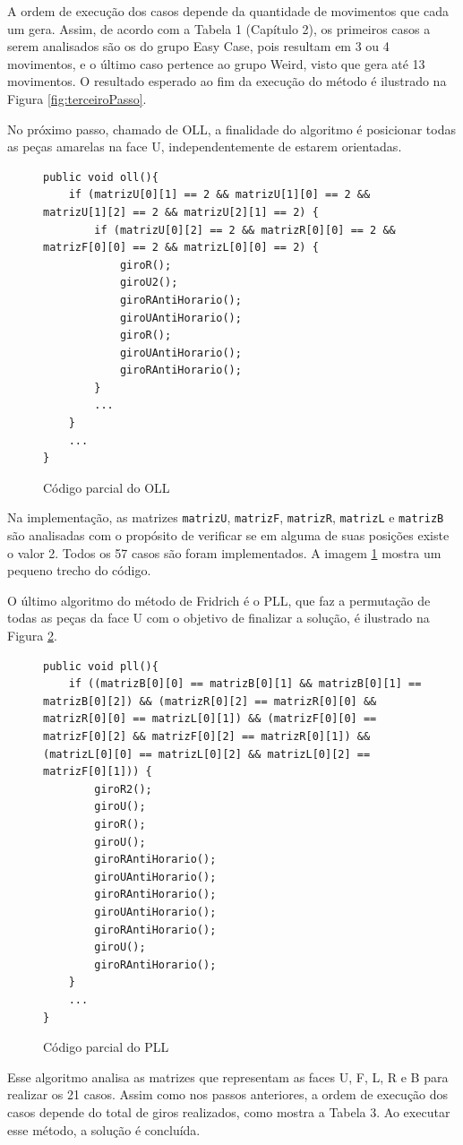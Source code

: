 A ordem de execução dos casos depende da quantidade de movimentos que cada um gera. Assim, de acordo com a Tabela 1 (Capítulo 2), os primeiros casos a serem analisados são os do grupo Easy Case, pois resultam em 3 ou 4 movimentos, e o último caso pertence ao grupo Weird, visto que gera até 13 movimentos. O resultado esperado ao fim da execução do método é ilustrado na Figura \ref{fig:terceiroPasso}.


No próximo passo, chamado de OLL, a finalidade do algoritmo é posicionar todas as peças amarelas na face U, independentemente de estarem orientadas. 

\begin{figure}[!htb]
\begin{lstlisting}
public void oll(){
    if (matrizU[0][1] == 2 && matrizU[1][0] == 2 && matrizU[1][2] == 2 && matrizU[2][1] == 2) {
        if (matrizU[0][2] == 2 && matrizR[0][0] == 2 && matrizF[0][0] == 2 && matrizL[0][0] == 2) {
            giroR();
            giroU2();
            giroRAntiHorario();
            giroUAntiHorario();
            giroR();
            giroUAntiHorario();
            giroRAntiHorario();
        }
        ...
    }
    ...
}
\end{lstlisting}
\caption{Código parcial do OLL}
\label{fig:fridrich3}
\end{figure}

Na implementação, as matrizes {\tt matrizU}, {\tt matrizF}, {\tt matrizR}, {\tt matrizL} e {\tt matrizB} são analisadas com o propósito de verificar se em alguma de suas posições existe o valor 2. Todos os 57 casos são foram implementados. A imagem \ref{fig:fridrich3} mostra um pequeno trecho do código. 



O último algoritmo do método de Fridrich é o PLL, que faz a permutação de todas as peças da face U com o objetivo de finalizar a solução, é ilustrado na Figura \ref{fig:fridrich4}.




\begin{figure}[!htb]
\begin{lstlisting}
public void pll(){
    if ((matrizB[0][0] == matrizB[0][1] && matrizB[0][1] == matrizB[0][2]) && (matrizR[0][2] == matrizR[0][0] && matrizR[0][0] == matrizL[0][1]) && (matrizF[0][0] == matrizF[0][2] && matrizF[0][2] == matrizR[0][1]) && (matrizL[0][0] == matrizL[0][2] && matrizL[0][2] == matrizF[0][1])) {
        giroR2();
        giroU();
        giroR();
        giroU();
        giroRAntiHorario();
        giroUAntiHorario();
        giroRAntiHorario();
        giroUAntiHorario();
        giroRAntiHorario();
        giroU();
        giroRAntiHorario();
    }
    ...
}
\end{lstlisting}
\caption{Código parcial do PLL}
\label{fig:fridrich4}
\end{figure}

Esse algoritmo analisa as matrizes que representam as faces U, F, L, R e B para realizar os 21 casos. Assim como nos passos anteriores, a ordem de execução dos casos depende do total de giros realizados, como mostra a Tabela 3. Ao executar esse método, a solução é concluída.





